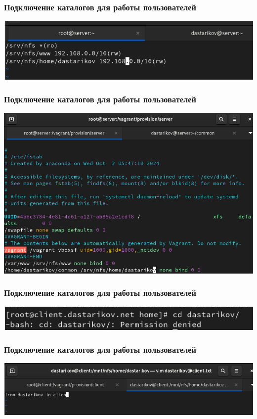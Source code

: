 \begin{frame}
\frametitle{Подключение каталогов для работы пользователей}
    \includegraphics[width=\textwidth]{../images/image23.png}
\end{frame}

\begin{frame}
\frametitle{Подключение каталогов для работы пользователей}
    \includegraphics[width=\textwidth]{../images/image28.png}
\end{frame}

\begin{frame}
\frametitle{Подключение каталогов для работы пользователей}
    \includegraphics[width=\textwidth]{../images/image24.png}
\end{frame}

\begin{frame}
\frametitle{Подключение каталогов для работы пользователей}
    \includegraphics[width=\textwidth]{../images/image29.png}
\end{frame}

